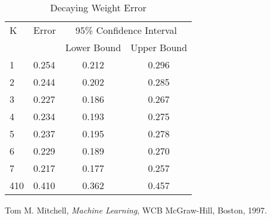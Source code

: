 \documentclass{article}
\begin{document}
\begin{table}
\caption{Decaying Weight Error}
\begin{center}
\begin{tabular}{llcc}
\toprule
K & Error & \multicolumn{2}{c}{95\% Confidence Interval} \\
\cmidrule(r){3-4}
& & Lower Bound & Upper Bound \\
\midrule
1 & 0.254 & 0.212 & 0.296 \\
2 & 0.244 & 0.202 & 0.285 \\
3 & 0.227 & 0.186 & 0.267 \\
4 & 0.234 & 0.193 & 0.275 \\
5 & 0.237 & 0.195 & 0.278 \\
6 & 0.229 & 0.189 & 0.270 \\
7 & 0.217 & 0.177 & 0.257 \\
410 & 0.410 & 0.362 & 0.457 \\
\bottomrule
\end{tabular}
\label{error}
\end{center}
\end{table}


\begin{thebibliography}{9}

  Tom M. Mitchell,
  \emph{Machine Learning},
  WCB McGraw-Hill, Boston,
  1997.

\end{thebibliography}
\end{document}
